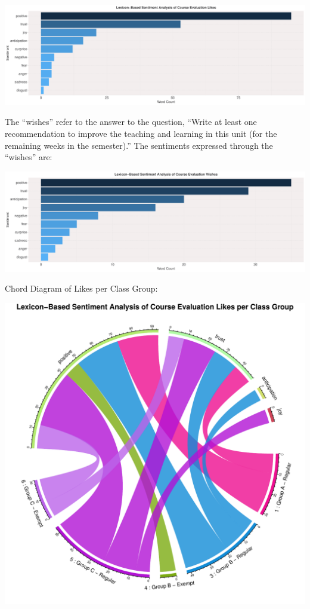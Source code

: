 \documentclass[
]{article}
\begin{document}
\includegraphics{AnalysisOfCourseEvaluation-Notebook_files/figure-latex/OverallSentimentForLikes-1.pdf}

The ``wishes'' refer to the answer to the question, ``Write at least one
recommendation to improve the teaching and learning in this unit (for
the remaining weeks in the semester).'' The sentiments expressed through
the ``wishes'' are:

\includegraphics{AnalysisOfCourseEvaluation-Notebook_files/figure-latex/OverallSentimentForWishes-1.pdf}

\newpage

Chord Diagram of Likes per Class Group:

\includegraphics{AnalysisOfCourseEvaluation-Notebook_files/figure-latex/ChordDiagramLikesPerGroup-1.pdf}
\end{document}
